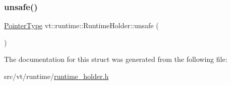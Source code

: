 \subsubsection{\texorpdfstring{unsafe()}{unsafe()}}
{\footnotesize\ttfamily \hyperlink{structvt_1_1runtime_1_1_runtime_holder_a9740e8aa7487fcf38b67a7e160d7b046}{Pointer\+Type} vt\+::runtime\+::\+Runtime\+Holder\+::unsafe (\begin{DoxyParamCaption}{ }\end{DoxyParamCaption})\hspace{0.3cm}{\ttfamily [inline]}}



The documentation for this struct was generated from the following file\+:\begin{DoxyCompactItemize}
\item 
src/vt/runtime/\hyperlink{runtime__holder_8h}{runtime\+\_\+holder.\+h}\end{DoxyCompactItemize}
